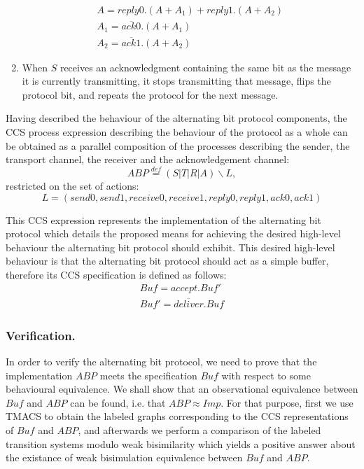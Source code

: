\begin{enumerate}
        \begin{equation*}\label{trans_imp}
	      	\begin{array}{lcl}
						A=reply0.\left(A+A_{1}\right)+reply1.\left(A+A_{2}\right)\\
						A_{1}=\overline{ack0}.\left(A+A_{1}\right)\\
						A_{2}=\overline{ack1}.\left(A+A_{2}\right)
					\end{array}
				\end{equation*}
  \item When $S$ receives an acknowledgment containing the same bit as the message it is currently transmitting, it stops transmitting that message, flips the protocol bit, and repeats the protocol for the next message.\cite{Kulick}\cite{ProcessAlgebraParallel}
\end{enumerate}

Having described the behaviour of the alternating bit protocol components, the CCS process expression describing the behaviour of the protocol as a whole can be obtained as a parallel composition of the processes describing the sender, the transport channel, the receiver and the acknowledgement channel:
\begin{equation}\label{abp_imp}
	\mathit{ABP} \stackrel{def}{=}\left(S|T|R|A\right)\backslash L,
\end{equation}
restricted on the set of actions:
\begin{equation*}
  L = \left(send0,send1,receive0,receive1,reply0,reply1,ack0,ack1\right)
\end{equation*}

This CCS expression represents the implementation of the alternating bit protocol which details the proposed means for achieving the desired high-level behaviour the alternating bit protocol should exhibit. This desired high-level behaviour is that the alternating bit protocol should act as a simple buffer, therefore its CCS specification is defined as follows:
\begin{equation}\label{eq:abp_spec}
	\begin{array}{lcl}
		\mathit{Buf} = \mathit{accept.Buf'}\\
		\mathit{Buf'} = \mathit{\overline{deliver}.Buf}
	\end{array}
\end{equation}

\subsubsection{Verification.} In order to verify the alternating bit protocol, we need to prove that the implementation $ABP$ meets the specification $Buf$ with respect to some behavioural equivalence. We shall show that an observational equivalence between $\mathit{Buf}$ and $\mathit{ABP}$ can be found, i.e. that $\mathit{ABP}\approx \mathit{Imp}$. For that purpose, first we use TMACS to obtain the labeled graphs corresponding to the CCS representations of $\mathit{Buf}$ and $\mathit{ABP}$, and afterwards we perform a comparison of the labeled transition systems modulo weak bisimilarity which yields a positive answer about the existance of weak bisimulation equivalence between $\mathit{Buf}$ and $\mathit{ABP}$.

